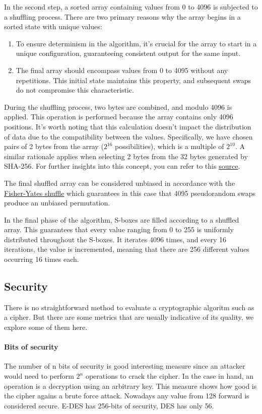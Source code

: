 \documentclass{article} %
\begin{document}
In the second step, a sorted array containing values from 0 to 4096 is subjected to a shuffling process. There are two primary reasons why the array begins in a sorted state with unique values:

\begin{enumerate}
\item To ensure determinism in the algorithm, it's crucial for the array to start in a unique configuration, guaranteeing consistent output for the same input.
\item The final array should encompass values from 0 to 4095 without any repetitions. This initial state maintains this property, and subsequent swaps do not compromise this characteristic.
\end{enumerate}

During the shuffling process, two bytes are combined, and modulo 4096 is applied. This operation is performed because the array contains only 4096 positions. It's worth noting that this calculation doesn't impact the distribution of data due to the compatibility between the values. Specifically, we have chosen pairs of 2 bytes from the array ($2^{16}$ possibilities), which is a multiple of $2^{10}$. A similar rationale applies when selecting 2 bytes from the 32 bytes generated by SHA-256. For further insights into this concept, you can refer to this \href{https://crypto.stackexchange.com/a/21010}{source}.

The final shuffled array can be considered unbiased in accordance with the \href{https://en.wikipedia.org/wiki/Fisher%E2%80%93Yates_shuffle}{Fisher-Yates shuffle} which guarantees in this case that 4095 pseudorandom swaps produce an unbiased permutation. 

In the final phase of the algorithm, S-boxes are filled according to a shuffled array. This guarantees that every value ranging from 0 to 255 is uniformly distributed throughout the S-boxes. It iterates 4096 times, and every 16 iterations, the value is incremented, meaning that there are 256 different values occurring 16 times each.


\subsection{Security}
There is no straightforward method to evaluate a cryptographic algoritm such as a cipher. But there are some metrics that are usually indicative of its quality, 
we explore some of them here.

\paragraph{Bits of security}
The number of n bits of security is good interesting measure since an attacker would need to perform $2^{n}$ operations to crack the cipher. In the case in hand, an operation
is a decryption using an arbitrary key. This measure shows how good is the cipher agains a brute force attack.
Nowadays any value from 128 forward is considered secure. E-DES has 256-bits of security, DES has only 56.
\end{document}
